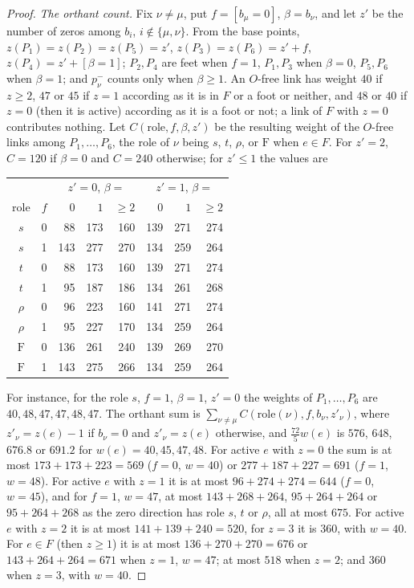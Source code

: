 \documentclass[11pt]{amsart}
\theoremstyle{definition}
\theoremstyle{remark}
\numberwithin{equation}{section}
\begin{document}
\begin{proof}
\emph{The orthant count.} Fix $\nu\ne\mu$, put $f=[b_\mu=0]$, $\beta=b_\nu$,
and let $z'$ be the number of zeros among $b_i$, $i\notin\{\mu,\nu\}$. From
the base points, $z(P_1)=z(P_2)=z(P_5)=z'$, $z(P_3)=z(P_6)=z'+f$,
$z(P_4)=z'+[\beta=1]$; $P_2,P_4$ are feet when $f=1$, $P_1,P_3$ when
$\beta=0$, $P_5,P_6$ when $\beta=1$; and $p^-_\nu$ counts only when
$\beta\ge1$. An $O$-free link has weight $40$ if $z\ge2$, $47$ or $45$ if
$z=1$ according as it is in $F$ or a foot or neither, and $48$ or $40$ if
$z=0$ (then it is active) according as it is a foot or not; a link of $F$ with
$z=0$ contributes nothing. Let $C(\text{role},f,\beta,z')$ be the resulting
weight of the $O$-free links among $P_1,\dots,P_6$, the role of $\nu$ being
$s$, $t$, $\rho$, or $\mathrm F$ when $e\in F$. For $z'=2$, $C=120$ if
$\beta=0$ and $C=240$ otherwise; for $z'\le1$ the values are
\begin{center}
\small
\begin{tabular}{cc|rrr|rrr}
\toprule
&&\multicolumn{3}{c|}{$z'=0$, $\beta=$}&\multicolumn{3}{c}{$z'=1$, $\beta=$}\\
role&$f$&$0$&$1$&${\ge}2$&$0$&$1$&${\ge}2$\\
\midrule
$s$&0&88&173&160&139&271&274\\
$s$&1&143&277&270&134&259&264\\
$t$&0&88&173&160&139&271&274\\
$t$&1&95&187&186&134&261&268\\
$\rho$&0&96&223&160&141&271&274\\
$\rho$&1&95&227&170&134&259&264\\
$\mathrm F$&0&136&261&240&139&269&270\\
$\mathrm F$&1&143&275&266&134&259&264\\
\bottomrule
\end{tabular}
\end{center}
For instance, for the role $s$, $f=1$, $\beta=1$, $z'=0$ the weights of
$P_1,\dots,P_6$ are $40,48,47,47,48,47$. The orthant sum is
$\sum_{\nu\ne\mu}C(\text{role}(\nu),f,b_\nu,z'_\nu)$, where $z'_\nu=z(e)-1$ if
$b_\nu=0$ and $z'_\nu=z(e)$ otherwise, and $\frac{72}5w(e)$ is $576$, $648$,
$676.8$ or $691.2$ for $w(e)=40,45,47,48$. For active $e$ with $z=0$ the sum
is at most $173+173+223=569$ ($f=0$, $w=40$) or $277+187+227=691$ ($f=1$,
$w=48$). For active $e$ with $z=1$ it is at most $96+274+274=644$ ($f=0$,
$w=45$), and for $f=1$, $w=47$, at most $143+268+264$, $95+264+264$ or
$95+264+268$ as the zero direction has role $s$, $t$ or $\rho$, all at most
$675$. For active $e$ with $z=2$ it is at most $141+139+240=520$, for $z=3$
it is $360$, with $w=40$. For $e\in F$ (then $z\ge1$) it is at most
$136+270+270=676$ or $143+264+264=671$ when $z=1$, $w=47$; at most $518$ when
$z=2$; and $360$ when $z=3$, with $w=40$.
\end{proof}
\end{document}
